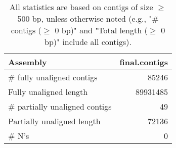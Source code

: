 \documentclass[12pt,a4paper]{article}
\begin{document}
\begin{table}[ht]
\begin{center}
\caption{All statistics are based on contigs of size $\geq$ 500 bp, unless otherwise noted (e.g., "\# contigs ($\geq$ 0 bp)" and "Total length ($\geq$ 0 bp)" include all contigs).}
\begin{tabular}{|l*{1}{|r}|}
\hline
Assembly & final.contigs \\ \hline
\# fully unaligned contigs & 85246 \\ \hline
Fully unaligned length & 89931485 \\ \hline
\# partially unaligned contigs & 49 \\ \hline
Partially unaligned length & 72136 \\ \hline
\# N's & 0 \\ \hline
\end{tabular}
\end{center}
\end{table}
\end{document}
